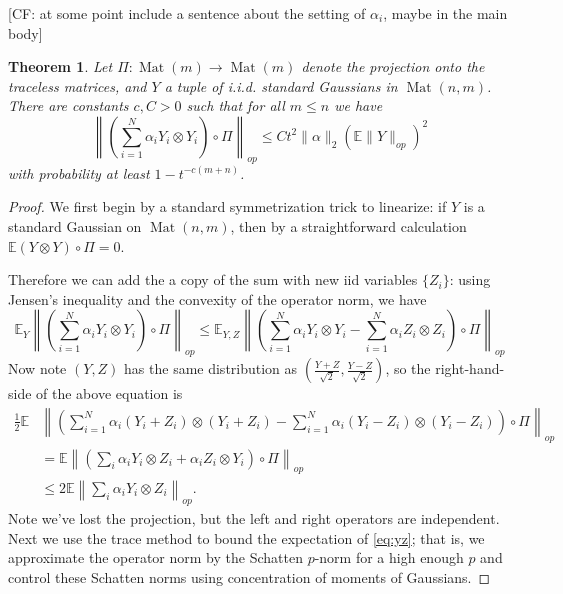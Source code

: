 \documentclass{article}
\newtheorem{theorem}{Theorem}
\newcommand{\ot}{\otimes}
\newcommand{\mat}{\operatorname{Mat}}
\newcommand{\E}{\mathbb{E}}
\newcommand\tr{\operatorname{Tr}}
\newcommand{\CF}[1]{{\color{purple}[CF: #1]}}
\begin{document}
\CF{at some point include a sentence about the setting of $\alpha_i$, maybe in the main body}
\begin{theorem}
Let $\Pi: \mat(m) \to \mat(m)$ denote the projection onto the traceless matrices, and $Y$ a tuple of i.i.d. standard Gaussians in $\mat(n,m)$. There are constants $c,C > 0$ such that for all $m \leq n$ we have 
\[ \left\| \left(\sum_{i=1}^{N} \alpha_{i} Y_{i} \otimes Y_{i}\right) \circ \Pi \right\|_{op} \leq C t^{2} \|\alpha\|_{2} \left( \E \|Y\|_{op} \right)^{2} \]
with probability at least $ 1- t^{-c(m+n)}$. 
\end{theorem}
\begin{proof}
We first begin by a standard symmetrization trick to linearize: if $Y$ is a standard Gaussian on $\mat(n,m)$, then by a straightforward calculation $\E (Y \otimes Y)\circ \Pi = 0$.

Therefore we can add the a copy of the sum with new iid variables $\{Z_{i}\}$: using Jensen's inequality and the convexity of the operator norm, we have
\[ \E_{Y} \left\|\left(\sum_{i=1}^{N} \alpha_{i} Y_{i} \otimes Y_{i}\right) \circ \Pi\right\|_{op} \leq 
\E_{Y,Z} \left\|\left(\sum_{i=1}^{N} \alpha_{i} Y_{i} \otimes Y_{i}-\sum_{i=1}^{N} \alpha_{i} Z_{i} \otimes Z_{i}\right) \circ \Pi \right\|_{op}  \] Now note $(Y,Z)$ has the same distribution as $(\frac{Y+Z}{\sqrt{2}},\frac{Y-Z}{\sqrt{2}})$, so the right-hand-side of the above equation is
\begin{align}\frac{1}{2}\E &\left\|\left(\sum_{i=1}^{N} \alpha_{i} (Y_{i}+Z_{i}) \otimes (Y_{i}+Z_{i})  - \sum_{i=1}^{N} \alpha_{i} (Y_{i}-Z_{i}) \otimes (Y_{i}-Z_{i})\right)\circ \Pi \right\|_{op}\nonumber \\ 
& = \E \left\|\left(\sum_{i} \alpha_{i} Y_{i} \otimes Z_{i}  + \alpha_{i} Z_{i} \otimes Y_{i} \right) \circ \Pi \right\|_{op}  \nonumber\\
& \leq 2 \E \left\|\sum_{i} \alpha_{i} Y_{i} \otimes Z_{i}\right\|_{op}.   \label{eq:yz}
\end{align}
Note we've lost the projection, but the left and right operators are independent. Next we use the trace method to bound the expectation of \cref{eq:yz}; that is, we approximate the operator norm by the Schatten $p$-norm for a high enough $p$ and control these Schatten norms using concentration of moments of Gaussians.  


\end{proof}
\end{document}
